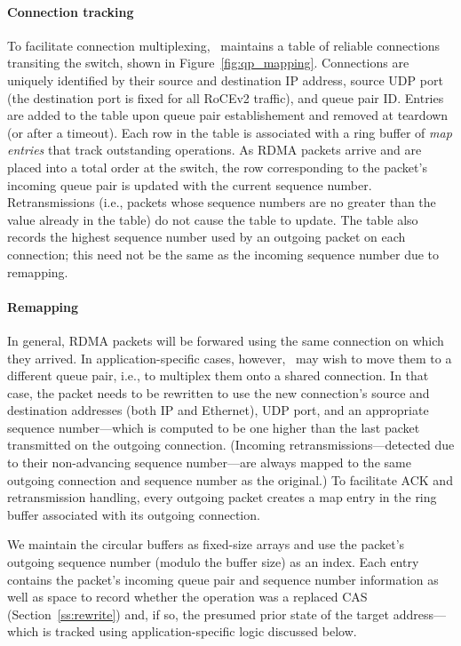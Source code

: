 \paragraph{Connection tracking}
%
To facilitate connection multiplexing, \sword\ maintains a table of
reliable connections transiting the switch, shown in
Figure~\ref{fig:qp_mapping}.  Connections are uniquely identified by
their source and destination IP address, source UDP port (the
destination port is fixed for all RoCEv2 traffic), and queue pair ID.
Entries are added to the table upon queue pair establishement and
removed at teardown (or after a timeout).  Each row in the table is
associated with a ring buffer of \emph{map entries} that track
outstanding operations.  As RDMA packets arrive and are placed into a
total order at the switch, the row corresponding to the packet's
incoming queue pair is updated with the current sequence number.
Retransmissions (i.e., packets whose sequence numbers are no greater
than the value already in the table) do not cause the table to update.
The table also records the highest sequence number used by an outgoing
packet on each connection; this need not be the same as the incoming
sequence number due to remapping.

\paragraph{Remapping}
\label{ss:remapping}
In general, RDMA packets will be forwared using the same connection on
which they arrived.  In application-specific cases, however,
\sword\ may wish to move them to a different queue pair, i.e., to
multiplex them onto a shared connection.  In that case, the packet
needs to be rewritten to use the new connection's source and
destination addresses (both IP and Ethernet), UDP port, and an
appropriate sequence number---which is computed to be one higher than
the last packet transmitted on the outgoing connection.  (Incoming
retransmissions---detected due to their non-advancing sequence
number---are always mapped to the same outgoing connection and
sequence number as the original.)  To facilitate ACK and
retransmission handling, every outgoing packet creates a map entry in
the ring buffer associated with its outgoing connection.

We maintain the circular buffers as fixed-size arrays and use the
packet's outgoing sequence number (modulo the buffer size) as an
index.  Each entry contains the packet's incoming queue pair and
sequence number information as well as space to record whether the
operation was a replaced CAS (Section~\ref{ss:rewrite}) and, if so,
the presumed prior state of the target address---which is tracked
using application-specific logic discussed below.

